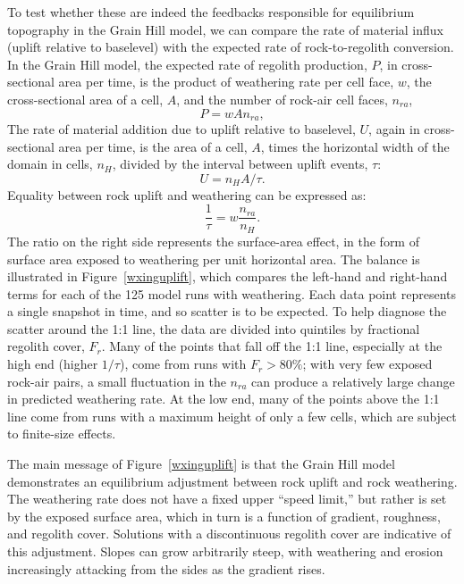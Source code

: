 \documentclass[esurf, manuscript]{copernicus}
\begin{document}
To test whether these are indeed the feedbacks responsible for equilibrium topography in the Grain Hill model, we can compare the rate of material influx (uplift relative to baselevel) with the expected rate of rock-to-regolith conversion. In the Grain Hill model, the expected rate of regolith production, $P$, in cross-sectional area per time, is the product of weathering rate per cell face, $w$, the cross-sectional area of a cell, $A$, and the number of rock-air cell faces, $n_{ra}$,
\begin{equation}
P = w A n_{ra},
\end{equation}
The rate of material addition due to uplift relative to baselevel, $U$, again in cross-sectional area per time, is the area of a cell, $A$, times the horizontal width of the domain in cells, $n_H$, divided by the interval between uplift events, $\tau$:
\begin{equation}
U = n_H A / \tau.
\end{equation}
Equality between rock uplift and weathering can be expressed as:
\begin{equation}
\frac{1}{\tau} = w\frac{n_{ra}}{n_H}.
\end{equation}
The ratio on the right side represents the surface-area effect, in the form of surface area exposed to weathering per unit horizontal area. The balance is illustrated in Figure~\ref{wxinguplift}, which compares the left-hand and right-hand terms for each of the 125 model runs with weathering. Each data point represents a single snapshot in time, and so scatter is to be expected. To help diagnose the scatter around the 1:1 line, the data are divided into quintiles by fractional regolith cover, $F_r$. Many of the points that fall off the 1:1 line, especially at the high end (higher $1/\tau$), come from runs with $F_r>80\%$; with very few exposed rock-air pairs, a small fluctuation in the $n_{ra}$ can produce a relatively large change in predicted weathering rate. At the low end, many of the points above the 1:1 line come from runs with a maximum height of only a few cells, which are subject to finite-size effects.

The main message of Figure~\ref{wxinguplift} is that the Grain Hill model demonstrates an equilibrium adjustment between rock uplift and rock weathering. The weathering rate does not have a fixed upper ``speed limit,'' but rather is set by the exposed surface area, which in turn is a function of gradient, roughness, and regolith cover. Solutions with a discontinuous regolith cover are indicative of this adjustment. Slopes can grow arbitrarily steep, with weathering and erosion increasingly attacking from the sides as the gradient rises. 
\end{document}
